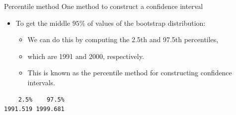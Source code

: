\documentclass[
  ignorenonframetext,
]{beamer}
\newenvironment{Shaded}{\begin{snugshade}}{\end{snugshade}}
\newcommand{\AttributeTok}[1]{\textcolor[rgb]{0.13,0.29,0.53}{#1}}
\newcommand{\CommentTok}[1]{\textcolor[rgb]{0.56,0.35,0.01}{\textit{#1}}}
\newcommand{\ConstantTok}[1]{\textcolor[rgb]{0.56,0.35,0.01}{#1}}
\newcommand{\ControlFlowTok}[1]{\textcolor[rgb]{0.13,0.29,0.53}{\textbf{#1}}}
\newcommand{\DecValTok}[1]{\textcolor[rgb]{0.00,0.00,0.81}{#1}}
\newcommand{\FloatTok}[1]{\textcolor[rgb]{0.00,0.00,0.81}{#1}}
\newcommand{\FunctionTok}[1]{\textcolor[rgb]{0.13,0.29,0.53}{\textbf{#1}}}
\newcommand{\NormalTok}[1]{#1}
\newcommand{\OtherTok}[1]{\textcolor[rgb]{0.56,0.35,0.01}{#1}}
\newcommand{\SpecialCharTok}[1]{\textcolor[rgb]{0.81,0.36,0.00}{\textbf{#1}}}
\providecommand{\tightlist}{%
  \setlength{\itemsep}{0pt}\setlength{\parskip}{0pt}}
\begin{document}
\begin{frame}[fragile]{Percentile method}
\label{percentile-method-2}
One method to construct a confidence interval

\begin{itemize}
\item
  To get the middle \(95\%\) of values of the bootstrap distribution:

  \begin{itemize}
  \tightlist
  \item
    We can do this by computing the 2.5th and 97.5th percentiles,
  \item
    which are 1991 and 2000, respectively.
  \item
    This is known as the percentile method for constructing confidence
    intervals.
  \end{itemize}
\end{itemize}

\small

\begin{Shaded}
\end{Shaded}

\begin{verbatim}
    2.5%    97.5% 
1991.519 1999.681 
\end{verbatim}

\normalsize
\end{frame}
\end{document}
